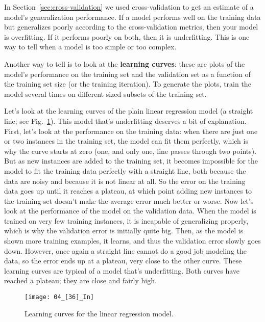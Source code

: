 In Section~\ref{sec:cross-validation} we used cross-validation to get an estimate of a model's generalization performance. If a model performs well on the training data but generalizes poorly according to the cross-validation metrics, then your model is overfitting. If it performs poorly on both, then it is underfitting. This is one way to tell when a model is too simple or too complex.

Another way to tell is to look at the \textbf{learning curves}: these are plots of the model's performance on the training set and the validation set as a function of the training set size (or the training iteration). To generate the plots, train the model several times on different sized subsets of the training set.

Let’s look at the learning curves of the plain linear regression model (a straight line; see Fig.~\ref{04_[36]_In}). This model that's underfitting deserves a bit of explanation. First, let's look at the performance on the training data: when there are just one or two instances in the training set, the model can fit them perfectly, which is why the curve starts at zero (one, and only one, line passes through two points). But as new instances are added to the training set, it becomes impossible for the model to fit the training data perfectly with a straight line, both because the data are noisy and because it is not linear at all. So the error on the training data goes up until it reaches a plateau, at which point adding new instances to the training set doesn't make the average error much better or worse. Now let's look at the performance of the model on the validation data. When the model is trained on very few training instances, it is incapable of generalizing properly, which is why the validation error is initially quite big. Then, as the model is shown more training examples, it learns, and thus the validation error slowly goes down. However, once again a straight line cannot do a good job modeling the data, so the error ends up at a plateau, very close to the other curve. These learning curves are typical of a model that's underfitting. Both curves have reached a plateau; they are close and fairly high.
\begin{figure}[h!t]
\centering
\texttt{[image: 04\_[36]\_In]}
\caption{Learning curves for the linear regression model.}\label{04_[36]_In}
\end{figure}

